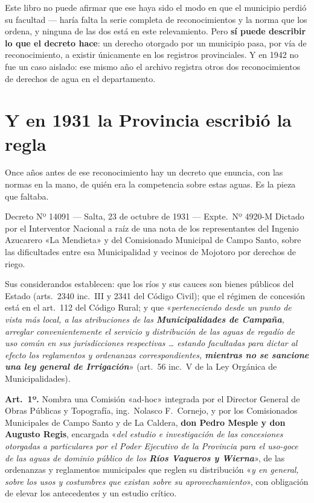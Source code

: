 Este libro no puede afirmar que ese haya sido el modo en que el municipio perdió su facultad
--- haría falta la serie completa de reconocimientos y la norma que los ordena, y ninguna de
las dos está en este relevamiento. Pero \textbf{sí puede describir lo que el decreto hace}: un
derecho otorgado por un municipio pasa, por vía de reconocimiento, a existir únicamente en
los registros provinciales. Y en 1942 no fue un caso aislado: ese mismo año el archivo
registra otros dos reconocimientos de derechos de agua en el departamento.

\section{Y en 1931 la Provincia escribió la regla}

Once años antes de ese reconocimiento hay un decreto que enuncia, con las normas en la mano,
de quién era la competencia sobre estas aguas. Es la pieza que faltaba.

\begin{ficha}{Decreto Nº 14091 --- Salta, 23 de octubre de 1931 --- Expte.\ Nº 4920-M}
Dictado por el Interventor Nacional a raíz de una nota de los representantes del Ingenio
Azucarero «La Mendieta» y del Comisionado Municipal de Campo Santo, sobre las dificultades
entre esa Municipalidad y vecinos de Mojotoro por derechos de riego.

Sus considerandos establecen: que los ríos y sus cauces son bienes públicos del Estado (arts.\
2340 inc.\ III y 2341 del Código Civil); que el régimen de concesión está en el art.\ 112 del
Código Rural; y que «\textit{perteneciendo desde un punto de vista más local, a las
atribuciones de las \textbf{Municipalidades de Campaña}, arreglar convenientemente el servicio
y distribución de las aguas de regadío de uso común en sus jurisdicciones respectivas …
estando facultadas para dictar al efecto los reglamentos y ordenanzas correspondientes,
\textbf{mientras no se sancione una ley general de Irrigación}}» (art.\ 56 inc.\ V de la Ley
Orgánica de Municipalidades).

\textbf{Art.\ 1º.} Nombra una Comisión «ad-hoc» integrada por el Director General de Obras
Públicas y Topografía, ing.\ Nolasco F.\ Cornejo, y por los Comisionados Municipales de Campo
Santo y de La Caldera, \textbf{don Pedro Mesple y don Augusto Regis}\index{Regis, Augusto},
encargada «\textit{del estudio e investigación de las concesiones otorgadas a particulares por
el Poder Ejecutivo de la Provincia para el uso-goce de las aguas de dominio público de los
\textbf{Ríos Vaqueros y Wierna}}», de las ordenanzas y reglamentos municipales que reglen su
distribución «\textit{y en general, sobre los usos y costumbres que existan sobre su
aprovechamiento}», con obligación de elevar los antecedentes y un estudio crítico.
\end{ficha}

